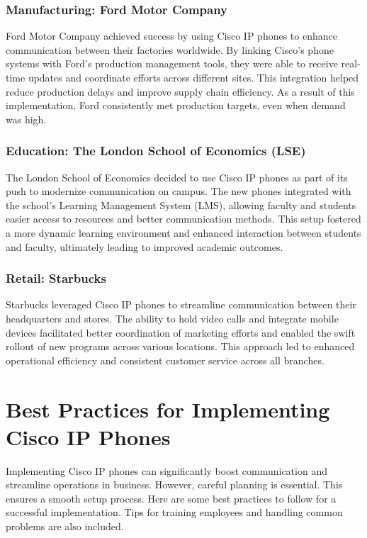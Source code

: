 \documentclass[11pt,a4paper]{article}
\begin{document}
\subsubsection*{Manufacturing: Ford Motor Company}
Ford Motor Company achieved success by using Cisco IP phones to enhance communication between their factories worldwide. By linking Cisco’s phone systems with Ford's production management tools, they were able to receive real-time updates and coordinate efforts across different sites. This integration helped reduce production delays and improve supply chain efficiency. As a result of this implementation, Ford consistently met production targets, even when demand was high.


\subsubsection*{Education: The London School of Economics (LSE)}

The London School of Economics decided to use Cisco IP phones as part of its push to modernize communication on campus. The new phones integrated with the school’s Learning Management System (LMS), allowing faculty and students easier access to resources and better communication methods. This setup fostered a more dynamic learning environment and enhanced interaction between students and faculty, ultimately leading to improved academic outcomes.


\subsubsection*{Retail: Starbucks}

Starbucks leveraged Cisco IP phones to streamline communication between their headquarters and stores. The ability to hold video calls and integrate mobile devices facilitated better coordination of marketing efforts and enabled the swift rollout of new programs across various locations. This approach led to enhanced operational efficiency and consistent customer service across all branches.


\section*{Best Practices for Implementing Cisco IP Phones}
Implementing Cisco IP phones can significantly boost communication and streamline operations in business. However, careful planning is essential. This ensures a smooth setup process. Here are some best practices to follow for a successful implementation. Tips for training employees and handling common problems are also included.
\end{document}
